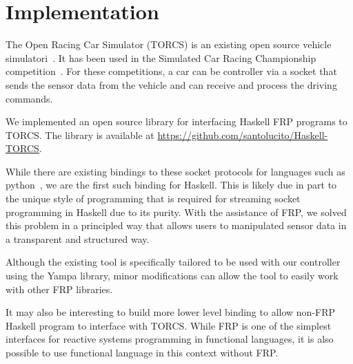 \section{Implementation}

The Open Racing Car Simulator (TORCS) is an existing open source vehicle simulatori~\cite{torcs}.
It has been used in the Simulated Car Racing Championship competition~\cite{SCRC}.
For these competitions, a car can be controller via a socket that sends the sensor data from the vehicle and can receive and process the driving commands.

We implemented an open source library for interfacing Haskell FRP programs to TORCS.
The library is available at \url{https://github.com/santolucito/Haskell-TORCS}.

While there are existing bindings to these socket protocols for languages such as python~\cite{snakeoil,pyscrc}, we are the first such binding for Haskell.
This is likely due in part to the unique style of programming that is required for streaming socket programming in Haskell due to its purity.
With the assistance of FRP, we solved this problem in a principled way that allows users to manipulated sensor data in a transparent and structured way.


Although the existing tool is specifically tailored to be used with our controller using the Yampa library,
  minor modifications can allow the tool to easily work with other FRP libraries.

It may also be interesting to build more lower level binding to allow non-FRP Haskell program to interface with TORCS.
While FRP is one of the simplest interfaces for reactive systems programming in functional languages, it is also possible to use functional language in this context without FRP.

